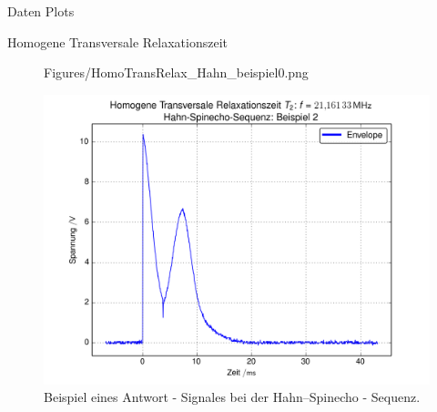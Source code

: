 \begin{appendix}
\begin{chapter}{Daten Plots}
\begin{section}{Homogene Transversale Relaxationszeit}
\begin{subsection}
\begin{figure}[htb]
\begin{minipage}{.48\textwidth}
            {Figures/HomoTransRelax_Hahn_beispiel0.png}
            \caption{Beispiel eines Antwort - Signales bei der
              Hahn--Spinecho - Sequenz.}
            \label{AnhangfigHahnBsp1}
          \end{minipage}\quad
          \begin{minipage}{.48\textwidth}
            \centering
            \includegraphics[width=\textwidth]
            {Figures/HomoTransRelax_Hahn_beispiel1.png}
            \caption{Beispiel eines Antwort - Signales bei der
              Hahn--Spinecho - Sequenz.}
            \label{AnhangfigHahnBsp2}
          \end{minipage}
        \end{figure}
        
      \end{subsection}
      

\end{section}
\end{chapter}
\end{appendix}
